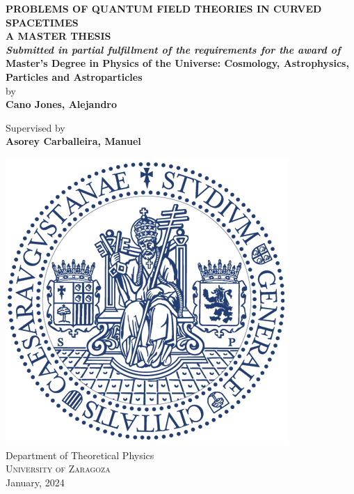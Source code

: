 \begin{titlepage}
	\vspace*{0.5cm}
	\begin{center}
		
		\Large \textbf {PROBLEMS OF QUANTUM FIELD THEORIES IN CURVED SPACETIMES}\\[0.8in]
		
		\vspace*{-0.5cm}
		\normalsize
		\textbf{A MASTER THESIS}\\[0.1in]
		\small
		\textit{\textbf{Submitted in partial fulfillment of
				the requirements for the award of }}\\[0.3in]
		
		\normalsize
		\textbf{Master's Degree in Physics of the Universe: Cosmology, Astrophysics, Particles and Astroparticles}\\[0.6in]
		\vspace*{-0.8cm}
		by \\
		\textbf{Cano Jones, Alejandro}
		
		
		
		
		\vspace{.3in}
		Supervised by\\
		{\textbf{Asorey Carballeira, Manuel}}\\[0.1in]
		
		\vfill
		
		\includegraphics[scale=0.3]{Images/Logos/Logo_Universidad.png}\\[0.1in]
		{Department of Theoretical Physics}\\
		\normalsize
		\textsc{University of Zaragoza}\\
		January, 2024
		
	\end{center}
	
\end{titlepage}